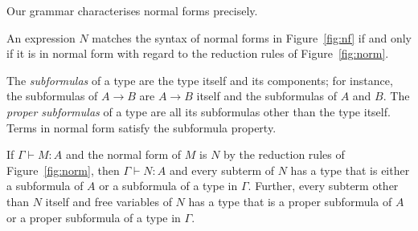 
Our grammar characterises normal forms precisely.

\begin{proposition}
\label{prop_normal}
An expression $N$ matches the syntax of normal forms in Figure~\ref{fig:nf}
if and only if it is in normal form with regard to the reduction rules of
Figure~\ref{fig:norm}.
\end{proposition}

The \emph{subformulas} of a type are the type itself and its components;
for instance, the subformulas of $A \to B$ are $A \to B$ itself
and the subformulas of $A$ and $B$. The \emph{proper subformulas} of a
type are all its subformulas other than the type itself.
Terms in normal form satisfy the subformula property.

\begin{proposition}
\label{prop_subformula}
If $\Gamma \vdash M:A$ and the normal form of $M$ is $N$
by the reduction rules of Figure~\ref{fig:norm}, then
$\Gamma \vdash N:A$ and every subterm of $N$ has a type
that is either a subformula of $A$ or a subformula of a type in $\Gamma$.
Further, every subterm other than $N$ itself and free variables of $N$
has a type that is a proper subformula of $A$ or a proper subformula of a type in $\Gamma$.
\end{proposition}




